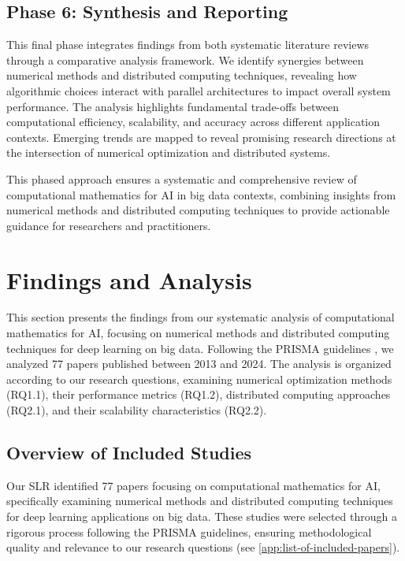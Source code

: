 \documentclass[acmsmall]{acmart}
\begin{document}
\subsection{Phase 6: Synthesis and Reporting}\label{subsec:phase-7-synthesis-and-reporting}

This final phase integrates findings from both systematic literature reviews through a comparative analysis framework. We identify synergies between numerical methods and distributed computing techniques, revealing how algorithmic choices interact with parallel architectures to impact overall system performance. The analysis highlights fundamental trade-offs between computational efficiency, scalability, and accuracy across different application contexts. Emerging trends are mapped to reveal promising research directions at the intersection of numerical optimization and distributed systems.

This phased approach ensures a systematic and comprehensive review of computational mathematics for AI in big data contexts, combining insights from numerical methods and distributed computing techniques to provide actionable guidance for researchers and practitioners.


\section{Findings and Analysis}\label{sec:findings-and-analysis}
This section presents the findings from our systematic analysis of computational mathematics for AI, focusing on numerical methods and distributed computing techniques for deep learning on big data. Following the PRISMA guidelines \citep{moher2009preferred}, we analyzed 77 papers published between 2013 and 2024. The analysis is organized according to our research questions, examining numerical optimization methods (RQ1.1), their performance metrics (RQ1.2), distributed computing approaches (RQ2.1), and their scalability characteristics (RQ2.2).


\subsection{Overview of Included Studies}\label{subsec:overview-of-included-studies}
Our SLR identified 77 papers focusing on computational mathematics for AI, specifically examining numerical methods and distributed computing techniques for deep learning applications on big data. These studies were selected through a rigorous process following the PRISMA guidelines, ensuring methodological quality and relevance to our research questions (see \cref{app:list-of-included-papers}).
\end{document}

